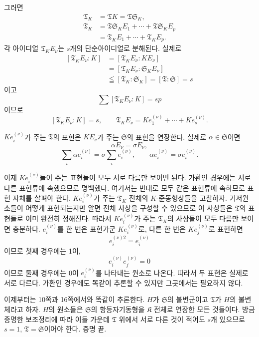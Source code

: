 그러면
\[
\begin{aligned}
\mathfrak T_K&=\mathfrak T K
 =\mathfrak T\mathfrak S_K,\\
\mathfrak T_K
&=\mathfrak T\mathfrak S_K E_1+\cdots
  +\mathfrak T\mathfrak S_K E_p\\
&=\mathfrak T_K E_1+\cdots+\mathfrak T_K E_p.
\end{aligned}
\]
각 아이디얼 \(\mathfrak T_K E_\nu\)는 \(s\)개의 단순아이디얼로 분해된다. 실제로
\[
\begin{aligned}
[\mathfrak T_K E_\nu:K]
&=[\mathfrak T_K E_\nu:K E_\nu]\\
&=[\mathfrak T_K E_\nu:\mathfrak S_K E_\nu]\\
&\leqq[\mathfrak T_K:\mathfrak S_K]
 =[\mathfrak T:\mathfrak S]=s
\end{aligned}
\]
이고
\[
        \sum[\mathfrak T_K E_\nu:K]=sp
\]
이므로
\[
        [\mathfrak T_K E_\nu:K]=s,
        \qquad
        \mathfrak T_K E_\nu
        =K e_1^{(\nu)}+\cdots+K e_s^{(\nu)}.
\]

\(K e_i^{(\nu)}\)가 주는 \(\mathfrak T\)의 표현은 \(K E_\nu\)가 주는 \(\mathfrak S\)의 표현을 연장한다. 실제로 \(\alpha\in\mathfrak S\)이면
\[
        \alpha E_\nu=\sigma E_\nu,
\]
\[
        \sum_i\alpha e_i^{(\nu)}
        =\sigma\sum_i e_i^{(\nu)},
        \qquad
        \alpha e_i^{(\nu)}
        =\sigma e_i^{(\nu)}.
\]

이제 \(K e_i^{(\nu)}\)들이 주는 표현들이 모두 서로 다름만 보이면 된다. 가환인 경우에는 서로 다른 표현류에 속했으므로 명백했다. 여기서는 반대로 모두 같은 표현류에 속하므로 표현 자체를 살펴야 한다. \(K e_i^{(\nu)}\)가 주는 \(\mathfrak T_K\) 전체의 \(K\)-준동형상들을 고찰하자. 기저원소들이 어떻게 표현되는지만 알면 전체 사상을 구성할 수 있으므로 이 사상들은 \(\mathfrak T\)의 표현들로 이미 완전히 정해진다. 따라서 \(K e_i^{(\nu)}\)가 주는 \(\mathfrak T_K\)의 사상들이 모두 다름만 보이면 충분하다. \(e_i^{(\nu)}\)를 한 번은 표현가군 \(K e_i^{(\nu)}\)로, 다른 한 번은 \(K e_j^{(\nu)}\)로 표현하면
\[
        e_i^{(\nu)2}=e_i^{(\nu)}
\]
이므로 첫째 경우에는 1이, 
\[
        e_i^{(\nu)}e_j^{(\nu)}=0
\]
이므로 둘째 경우에는 0이 \(e_i^{(\nu)}\)를 나타내는 원소로 나온다. 따라서 두 표현은 실제로 서로 다르다. 가환인 경우에도 똑같이 추론할 수 있지만 그곳에서는 필요하지 않다.

이제부터는 10쪽과 16쪽에서와 똑같이 추론한다. \(H\)가 \(\mathfrak S\)의 불변군이고 \(\mathfrak T\)가 \(H\)의 불변체라고 하자. \(H\)의 원소들은 \(\mathfrak S\)의 항등자기동형을 \(\mathfrak K\) 전체로 연장한 모든 것들이다. 방금 증명한 보조정리에 따라 이들 가운데 \(\mathfrak T\) 위에서 서로 다른 것이 적어도 \(s\)개 있으므로 \(s=1\), \(\mathfrak T=\mathfrak S\)이어야 한다. 증명 끝.

